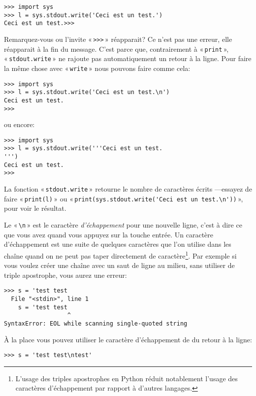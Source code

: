 \begin{Verbatim}[frame=single,rulecolor=\color{gray}]
>>> import sys
>>> l = sys.stdout.write('Ceci est un test.')
Ceci est un test.>>>
\end{Verbatim}

Remarquez-vous ou l'invite « \texttt{>>>} » réapparait? Ce n'est pas une erreur, elle réapparait à la fin du message. C'est parce que, contrairement à « \texttt{print} », « \texttt{stdout.write} » ne rajoute pas automatiquement un retour à la ligne. Pour faire la même chose avec « \texttt{write} »  nous pouvons faire comme cela:

\begin{Verbatim}[frame=single,rulecolor=\color{gray}]
>>> import sys
>>> l = sys.stdout.write('Ceci est un test.\n')
Ceci est un test.
>>>
\end{Verbatim}
ou encore: 
\begin{Verbatim}[frame=single,rulecolor=\color{gray}]
>>> import sys
>>> l = sys.stdout.write('''Ceci est un test.
''')
Ceci est un test.
>>>
\end{Verbatim}

La fonction « \texttt{stdout.write} » retourne le nombre de caractères écrits ---essayez de faire « \texttt{print(l)} » ou « \verb+print(sys.stdout.write('Ceci est un test.\n'))+ », pour voir le résultat.

Le « \texttt{{\textbackslash}n} » est le caractère \emph{d'échappement} pour une nouvelle ligne, c'est à dire ce que vous avez quand vous appuyez sur la touche entrée. Un caractère d'échappement est une suite de quelques caractères que l'on utilise dans les chaîne quand on ne peut pas taper directement de caractère\footnote{L'usage des triples apostrophes en Python réduit notablement l'usage des caractères d'échappement par rapport à d'autres langages.}. Par exemple si vous voulez créer une chaîne avec un saut de ligne au milieu, sans utiliser de triple apostrophe, vous aurez une erreur:
\begin{Verbatim}[frame=single,rulecolor=\color{red},label=ne fonctionne pas]
>>> s = 'test test 
  File "<stdin>", line 1
    s = 'test test 
                  ^
SyntaxError: EOL while scanning single-quoted string
\end{Verbatim}

À la place vous pouvez utiliser le caractère d'échappement de du retour à la ligne:

\begin{Verbatim}[frame=single,rulecolor=\color{gray}]
>>> s = 'test test\ntest'
\end{Verbatim}


